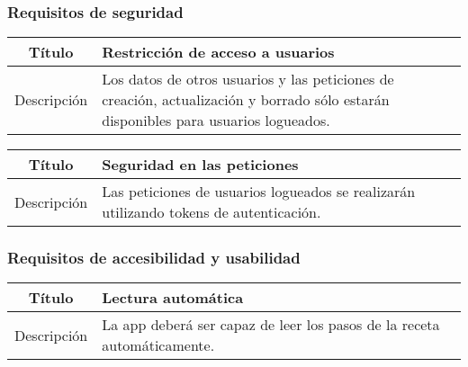 \subsubsection{Requisitos de seguridad}

\begin{center}
  
  \begin{tabularx}{\textwidth}{|c|X|}
    \hline
    Título & Restricción de acceso a usuarios \\

    \hline

    Descripción & Los datos de otros usuarios y las peticiones de creación,
    actualización y borrado sólo estarán disponibles para usuarios logueados.\\


    \hline
  \end{tabularx}
\end{center}

\begin{center}
  
  \begin{tabularx}{\textwidth}{|c|X|}
    \hline
    Título & Seguridad en las peticiones \\

    \hline

    Descripción & Las peticiones de usuarios logueados se realizarán utilizando
    tokens de autenticación.\\


    \hline
  \end{tabularx}
\end{center}


\subsubsection{Requisitos de accesibilidad y usabilidad}

\begin{center}
  
  \begin{tabularx}{\textwidth}{|c|X|}
    \hline
    Título & Lectura automática \\

    \hline

    Descripción & La app deberá ser capaz de leer los pasos de la receta
    automáticamente.\\

    \hline
  \end{tabularx}
  \label{tab:accesibilidad}
\end{center}

